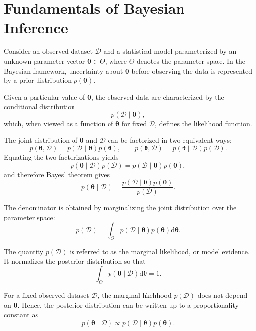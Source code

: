 \documentclass[../../Bayesian_Inference.tex]{subfiles}
\begin{document}
\chapter{Fundamentals of Bayesian Inference} 

Consider an observed dataset $\mathcal{D}$ and a statistical model parameterized by an unknown parameter vector $\bm{\theta} \in \Theta$, where $\Theta$ denotes the parameter space. In the Bayesian framework, uncertainty about $\bm{\theta}$ before observing the data is represented by a prior distribution $p(\bm{\theta})$.

Given a particular value of $\bm{\theta}$, the observed data are characterized by the conditional distribution
\[
    p(\mathcal{D}\mid\bm{\theta}),
\]
which, when viewed as a function of $\bm{\theta}$ for fixed $\mathcal{D}$, defines the likelihood function.

The joint distribution of $\bm{\theta}$ and $\mathcal{D}$ can be factorized in two equivalent ways:
\[
    p(\bm{\theta},\mathcal{D})
    =
    p(\mathcal{D}\mid\bm{\theta})p(\bm{\theta}),
    \qquad 
    p(\bm{\theta},\mathcal{D})
    =
    p(\bm{\theta}\mid\mathcal{D})p(\mathcal{D}).
\]
Equating the two factorizations yields
\[
    p(\bm{\theta}\mid\mathcal{D})p(\mathcal{D})
    =
    p(\mathcal{D}\mid\bm{\theta})p(\bm{\theta}),
\]
and therefore Bayes' theorem gives
\begin{equation}
    \boxed{
    p(\bm{\theta}\mid\mathcal{D})
    =
    \frac{
        p(\mathcal{D}\mid\bm{\theta})p(\bm{\theta})
    }{
        p(\mathcal{D})
    }}
    .
\end{equation}

The denominator is obtained by marginalizing the joint distribution over the parameter space:
\begin{equation}
    \boxed{p(\mathcal{D})
    = 
    \int_{\Theta}
    p(\mathcal{D}\mid\bm{\theta})
    p(\bm{\theta})
    \mathrm{d}\bm{\theta}}
    .    
\end{equation} 

The quantity $p(\mathcal{D})$ is referred to as the marginal likelihood, or model evidence. It normalizes the posterior distribution so that
\[
    \int_{\Theta}
    p(\bm{\theta}\mid\mathcal{D})
    \mathrm{d}\bm{\theta}
    =
    1.
\]

For a fixed observed dataset $\mathcal{D}$, the marginal likelihood $p(\mathcal{D})$ does not depend on $\bm{\theta}$. Hence, the posterior distribution can be written up to a proportionality constant as
\begin{equation}
    \boxed{
    p(\bm{\theta}\mid\mathcal{D})
    \propto
    p(\mathcal{D}\mid\bm{\theta})
    p(\bm{\theta})}.
\end{equation}
\end{document}

